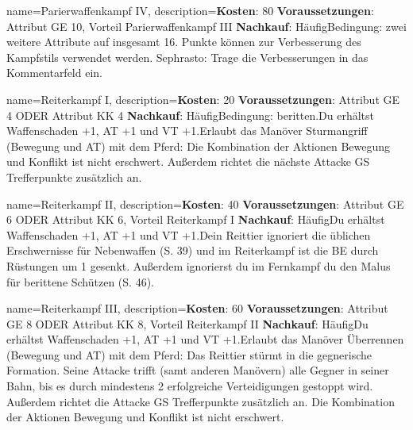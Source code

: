 {
    name={Parierwaffenkampf IV},
    description={\textbf{Kosten}: 80 \textbf{Voraussetzungen}: Attribut GE 10, Vorteil Parierwaffenkampf III \textbf{Nachkauf}: Häufig\newline Bedingung: zwei weitere Attribute auf insgesamt 16. Punkte können zur Verbesserung des Kampfstils verwendet werden. Sephrasto: Trage die Verbesserungen in das Kommentarfeld ein.}
}


{
    name={Reiterkampf I},
    description={\textbf{Kosten}: 20 \textbf{Voraussetzungen}: Attribut GE 4 ODER Attribut KK 4 \textbf{Nachkauf}: Häufig\newline Bedingung: beritten.\newline Du erhältst Waffenschaden +1, AT +1 und VT +1.\newline Erlaubt das Manöver Sturmangriff (Bewegung und AT) mit dem Pferd: Die Kombination der Aktionen Bewegung und Konflikt ist nicht erschwert. Außerdem richtet die nächste Attacke GS Trefferpunkte zusätzlich an.}
}


{
    name={Reiterkampf II},
    description={\textbf{Kosten}: 40 \textbf{Voraussetzungen}: Attribut GE 6 ODER Attribut KK 6, Vorteil Reiterkampf I \textbf{Nachkauf}: Häufig\newline Du erhältst Waffenschaden +1, AT +1 und VT +1.\newline Dein Reittier ignoriert die üblichen Erschwernisse für Nebenwaffen (S. 39) und im Reiterkampf ist die BE durch Rüstungen um 1 gesenkt. Außerdem ignorierst du im Fernkampf du den Malus für berittene Schützen (S. 46).}
}


{
    name={Reiterkampf III},
    description={\textbf{Kosten}: 60 \textbf{Voraussetzungen}: Attribut GE 8 ODER Attribut KK 8, Vorteil Reiterkampf II \textbf{Nachkauf}: Häufig\newline Du erhältst Waffenschaden +1, AT +1 und VT +1.\newline Erlaubt das Manöver Überrennen (Bewegung und AT) mit dem Pferd: Das Reittier stürmt in die gegnerische Formation. Seine Attacke trifft (samt anderen Manövern) alle Gegner in seiner Bahn, bis es durch mindestens 2 erfolgreiche Verteidigungen gestoppt wird. Außerdem richtet die Attacke GS Trefferpunkte zusätzlich an. Die Kombination der Aktionen Bewegung und Konflikt ist nicht erschwert.}
}



